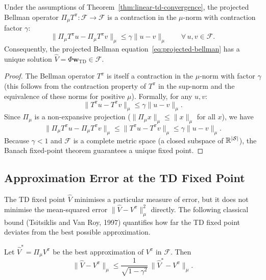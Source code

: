 \begin{theorem}
\label{thm:td-fixed-point}
Under the assumptions of Theorem~\ref{thm:linear-td-convergence}, the projected Bellman operator
$\Pi_\mu T^\pi : \mathcal{F} \to \mathcal{F}$ is a contraction in the $\mu$-norm with
contraction factor $\gamma$:
\begin{equation}
\label{eq:projected-contraction}
\|\Pi_\mu T^\pi u - \Pi_\mu T^\pi v\|_\mu \leq \gamma \|u - v\|_\mu
\qquad \forall\, u, v \in \mathcal{F}.
\end{equation}
Consequently, the projected Bellman equation~\eqref{eq:projected-bellman} has a unique solution
$\hat{V} = \Phi \mathbf{w}_{\mathrm{TD}} \in \mathcal{F}$.
\end{theorem}

\begin{proof}
The Bellman operator $T^\pi$ is itself a contraction in the $\mu$-norm with factor $\gamma$
(this follows from the contraction property of $T^\pi$ in the sup-norm and the equivalence of
these norms for positive $\mu$).  Formally, for any $u, v$:
\[
\|T^\pi u - T^\pi v\|_\mu \leq \gamma \|u - v\|_\mu.
\]
Since $\Pi_\mu$ is a non-expansive projection ($\|\Pi_\mu x\|_\mu \leq \|x\|_\mu$ for all $x$),
we have
\[
\|\Pi_\mu T^\pi u - \Pi_\mu T^\pi v\|_\mu
\leq \|T^\pi u - T^\pi v\|_\mu
\leq \gamma \|u - v\|_\mu.
\]
Because $\gamma < 1$ and $\mathcal{F}$ is a complete metric space (a closed subspace of
$\mathbb{R}^{|\mathcal{S}|}$), the Banach fixed-point theorem guarantees a unique fixed point.
\end{proof}

\subsection{Approximation Error at the TD Fixed Point}

The TD fixed point $\hat{V}$ minimises a particular measure of error, but it does not minimise the
mean-squared error $\|\hat{V} - V^\pi\|_\mu^2$ directly.  The following classical bound
(Tsitsiklis and Van Roy, 1997) quantifies how far the TD fixed point deviates from the best
possible approximation.

\begin{theorem}
\label{thm:td-bound}
Let $\hat{V}^* = \Pi_\mu V^\pi$ be the best approximation of $V^\pi$ in $\mathcal{F}$.  Then
\begin{equation}
\label{eq:td-bound}
\|\hat{V} - V^\pi\|_\mu \leq \frac{1}{\sqrt{1 - \gamma^2}}\, \|\hat{V}^* - V^\pi\|_\mu.
\end{equation}
\end{theorem}

